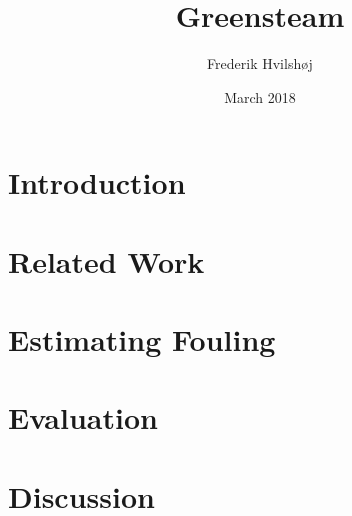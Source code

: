 \documentclass{article}
\title{Greensteam}
\author{Frederik Hvilshøj}
\date{March 2018}
\begin{document}
\maketitle

\section{Introduction}
\label{sec:introduction}


\cite{andrewartha2010, cho2016, olanrewaju2013marine, schultz2007, towsin2003}


\section{Related Work}
\label{sec:related-work}

\section{Estimating Fouling}
\label{sec:estimating-fouling}

\section{Evaluation}
\label{evaluation}

\section{Discussion}
\label{sec:discussion}



\end{document}
